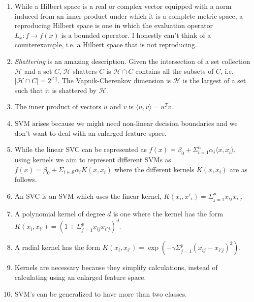 \documentclass{article}
\begin{document}
\begin{enumerate}
    \item While a Hilbert space is a real or complex vector equipped with a norm induced from an inner product under which it is a complete metric space, a reproducing Hilbert space is one in which the evaluation operator $L_x: f \rightarrow f(x)$ is a bounded operator. I honestly can't think of a counterexample, i.e. a Hilbert space that is not reproducing.
    \item \textit{Shattering} is an amazing description. Given the intersection of a set collection $\mathcal{H}$ and a set $C$, $\mathcal{H}$ shatters $C$ is $\mathcal{H} \cap C$ contains all the subsets of $C$, i.e. $|\mathcal{H} \cap C| = 2^{|C|}$. The Vapnik-Cherenkov dimension is $\mathcal{H}$ is the largest of a set such that it is shattered by $\mathcal{H}$. 
    \item The inner product of vectors $u$ and $v$ is $\langle u,v \rangle = u^Tv$.
    \item SVM arises because we might need non-linear decision boundaries and we don't want to deal with an enlarged feature space.
    \item While the linear SVC can be represented as $f(x) = \beta_0+\Sigma^n_{i=1} \alpha_i\langle x,x_i \rangle$, using kernels we aim to represent different SVMs as $f(x) = \beta_0 + \Sigma_{i\in \mathcal{S}} \alpha_i K(x,x_i)$ where the different kernels $K(x,x_i)$ are as follows.
    \item An SVC is an SVM which uses the linear kernel, $K(x_i,x'_i) = \Sigma^p_{j=1}x_{ij}x_{i'j}$
    \item A polynomial kernel of degree $d$ is one where the kernel has the form $K(x_i,x_{i'}) = (1+\Sigma^p_{j=1} x_{ij}x_{i'j})^d$.
    \item A radial kernel has the form $K(x_i,x_{i'}) = \exp(-\gamma \Sigma^p_{j=1}(x_{ij}-x_{i'j})^2)$. 
    \item Kernels are necessary because they simplify calculations, instead of calculating using an enlarged feature space.
    \item  SVM's can be generalized to have more than two classes.
\end{enumerate}
\end{document}
